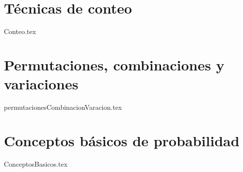 \section{T\'ecnicas de conteo}
{Conteo.tex}
\section{Permutaciones, combinaciones y variaciones}
{permutacionesCombinacionVaracion.tex}
\section{Conceptos b\'asicos de probabilidad}
{ConceptosBasicos.tex}